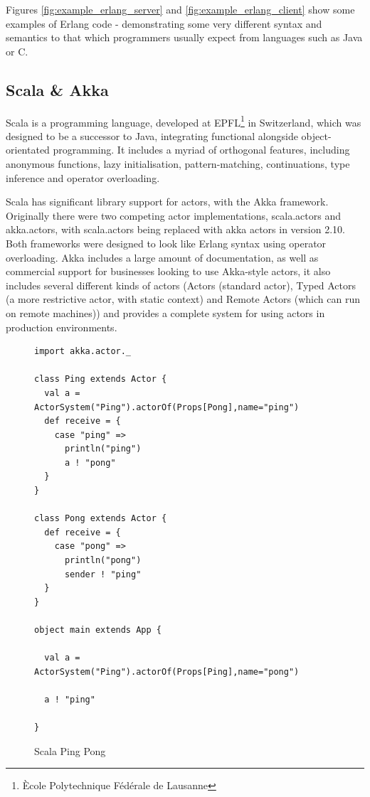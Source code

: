 \documentclass[pdftex,11pt,a4paper]{report}
\begin{document}
Figures \ref{fig:example_erlang_server} and \ref{fig:example_erlang_client} show some examples of Erlang code - demonstrating some very different syntax and semantics to that which programmers usually expect from languages such as Java or C.

\subsection{Scala \& Akka}

Scala is a programming language, developed at EPFL\footnote{\`{E}cole Polytechnique F\'{e}d\'{e}rale de Lausanne} in Switzerland, which was designed to be a successor to Java, integrating functional alongside object-orientated programming.
It includes a myriad of orthogonal features, including anonymous functions, lazy initialisation, pattern-matching, continuations, type inference and operator overloading.

Scala has significant library support for actors, with the Akka framework.
Originally there were two competing actor implementations, scala.actors and akka.actors, with scala.actors being replaced with akka actors in version 2.10\cite{scala-actor-migration}.
Both frameworks were designed to look like Erlang syntax using operator overloading.
Akka includes a large amount of documentation, as well as commercial support for businesses looking to use Akka-style actors, it also includes several different kinds of actors (Actors (standard actor), Typed Actors (a more restrictive actor, with static context) and Remote Actors (which can run on remote machines)) and provides a complete system for using actors in production environments.

\begin{figure}[H]
\begin{verbatim}
import akka.actor._

class Ping extends Actor {
  val a = ActorSystem("Ping").actorOf(Props[Pong],name="ping")
  def receive = {
    case "ping" =>
      println("ping")
      a ! "pong"
  }
}

class Pong extends Actor {
  def receive = {
    case "pong" =>
      println("pong")
      sender ! "ping"
  }
}

object main extends App {

  val a = ActorSystem("Ping").actorOf(Props[Ping],name="pong")

  a ! "ping"

}
\end{verbatim}
\caption{Scala Ping Pong}
\label{fig:scala-ping-pong}
\end{figure}
\end{document}
